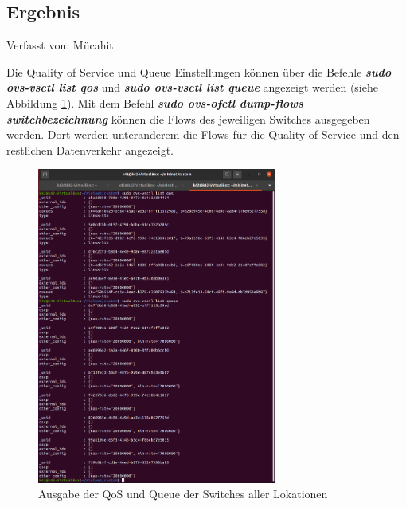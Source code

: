 \documentclass[fontsize=12pt,paper=a4,open=any,parskip=half,
  twoside=false,toc=listof,toc=bibliography,fleqn,leqno,
  captions=nooneline,captions=tableabove,british]{scrbook}
\begin{document}
\subsection{Ergebnis}
{\tiny Verfasst von: Mücahit\par}
Die Quality of Service und Queue Einstellungen können über die Befehle \textit{\textbf{sudo ovs-vsctl list qos}} und \textit{\textbf{sudo ovs-vsctl list queue}} angezeigt werden (siehe Abbildung \ref{queue-qos}). Mit dem Befehl \textit{\textbf{sudo ovs-ofctl dump-flows switchbezeichnung}} können die Flows des jeweiligen Switches ausgegeben werden. Dort werden unteranderem die Flows für die Quality of Service und den restlichen Datenverkehr angezeigt.

\begin{figure}[H]
 \centering
 \includegraphics[width=0.7\textwidth]{Bilder/queue-qos}
 \captionsetup{justification=centering}
 \caption{Ausgabe der QoS und Queue der Switches aller Lokationen}
 \label{queue-qos}
\end{figure}
\end{document}

